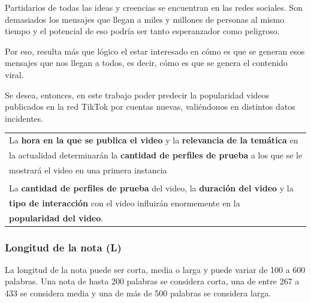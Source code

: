 \documentclass{article}
\begin{document}
Partidarios de todas las ideas y creencias se encuentran en las redes sociales. Son demasiados
los mensajes que llegan a miles y millones de personas al mismo tiempo y el potencial de eso
podría ser tanto esperanzador como peligroso. 

Por eso, resulta más que lógico el estar interesado en cómo es que se generan esos mensajes que 
nos llegan a todos, es decir, cómo es que se genera el contenido viral.

Se desea, entonces, en este trabajo poder predecir la popularidad videos publicados en la red TikTok 
por cuentas nuevas, valiéndonos en distintos datos incidentes. 




\begin{center}
	\begin{tabular}{|l}
	La \textbf{hora en la que se publica el video} y la \textbf{relevancia de la temática} en \\
	la actualidad determinarán la \textbf{cantidad de perfiles de prueba} a los que se le \\
	mostrará el video en una primera instancia\\\\

	La \textbf{cantidad de perfiles de prueba} del video, la \textbf{duración del video} y la \\
	\textbf{tipo de interacción} con el video influirán enormemente en la \\ \textbf{popularidad del video}.
	\end{tabular}
\end{center}

\iffalse
\subsubsection*{Longitud de la nota (L)}

La longitud de la nota puede ser corta, media o larga y puede variar de 100 a 600 palabras. Una nota de hasta 200 palabras se considera corta, una de entre 267 a 433 se considera media y una de más de 500 palabras se considera larga.
\end{document}
